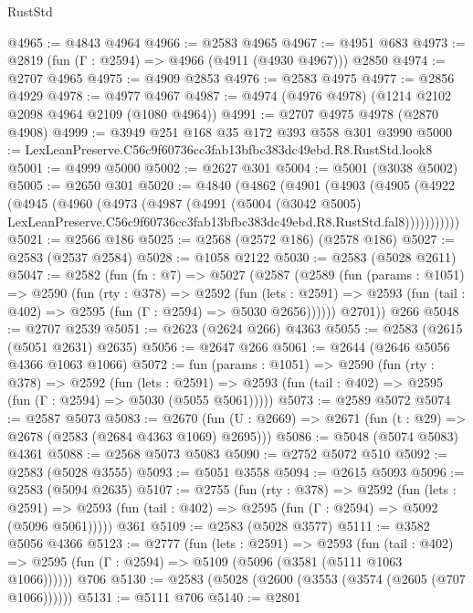 \begin{lexlean}{RustStd}
\begin{coremodule}
@4965 := @4843 @4964
@4966 := @2583 @4965
@4967 := @4951 @683
@4973 := @2819 (fun (Γ : @2594) => @4966 (@4911 (@4930 @4967))) @2850
@4974 := @2707 @4965
@4975 := @4909 @2853
@4976 := @2583 @4975
@4977 := @2856 @4929
@4978 := @4977 @4967
@4987 := @4974 (@4976 @4978) (@1214 @2102 @2098 @4964 @2109 (@1080 @4964))
@4991 := @2707 @4975 @4978 (@2870 @4908)
@4999 := @3949 @251 @168 @35 @172 @393 @558 @301 @3990
@5000 := LexLeanPreserve.C56c9f60736cc3fab13bfbc383dc49ebd.R8.RustStd.look8
@5001 := @4999 @5000
@5002 := @2627 @301
@5004 := @5001 (@3038 @5002)
@5005 := @2650 @301
@5020 := @4840
    (@4862
      (@4901
        (@4903
          (@4905
            (@4922
              (@4945
                (@4960
                  (@4973
                    (@4987
                      (@4991
                        (@5004
                          (@3042 @5005)
                          LexLeanPreserve.C56c9f60736cc3fab13bfbc383dc49ebd.R8.RustStd.fal8)))))))))))
@5021 := @2566 @186
@5025 := @2568 (@2572 @186) (@2578 @186)
@5027 := @2583 (@2537 @2584)
@5028 := @1058 @2122
@5030 := @2583 (@5028 @2611)
@5047 := @2582
    (fun (fn : @7) =>
    @5027
      (@2587
        (@2589
          (fun (params : @1051) =>
          @2590
            (fun (rty : @378) =>
            @2592
              (fun (lets : @2591) =>
              @2593 (fun (tail : @402) => @2595 (fun (Γ : @2594) => @5030 @2656))))))
        @2701))
    @266
@5048 := @2707 @2539
@5051 := @2623 (@2624 @266) @4363
@5055 := @2583 (@2615 (@5051 @2631) @2635)
@5056 := @2647 @266
@5061 := @2644 (@2646 @5056 @4366 @1063 @1066)
@5072 := fun (params : @1051) =>
  @2590
    (fun (rty : @378) =>
    @2592
      (fun (lets : @2591) =>
      @2593 (fun (tail : @402) => @2595 (fun (Γ : @2594) => @5030 (@5055 @5061)))))
@5073 := @2589 @5072
@5074 := @2587 @5073
@5083 := @2670 (fun (U : @2669) => @2671 (fun (t : @29) => @2678 (@2583 (@2684 @4363 @1069) @2695)))
@5086 := @5048 (@5074 @5083) @4361
@5088 := @2568 @5073 @5083
@5090 := @2752 @5072 @510
@5092 := @2583 (@5028 @3555)
@5093 := @5051 @3558
@5094 := @2615 @5093
@5096 := @2583 (@5094 @2635)
@5107 := @2755
    (fun (rty : @378) =>
    @2592
      (fun (lets : @2591) =>
      @2593 (fun (tail : @402) => @2595 (fun (Γ : @2594) => @5092 (@5096 @5061)))))
    @361
@5109 := @2583 (@5028 @3577)
@5111 := @3582 @5056 @4366
@5123 := @2777
    (fun (lets : @2591) =>
    @2593
      (fun (tail : @402) => @2595 (fun (Γ : @2594) => @5109 (@5096 (@3581 (@5111 @1063 @1066))))))
    @706
@5130 := @2583 (@5028 (@2600 (@3553 (@3574 (@2605 (@707 @1066))))))
@5131 := @5111 @706
@5140 := @2801

\end{coremodule}
\end{lexlean}
